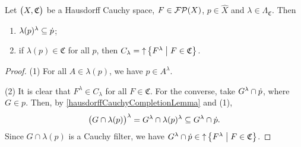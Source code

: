 \begin{lemma} \label{ReedMapToCauchyFilter}
Let $\sSet[\big]{X, \mathfrak{C}}$ be a Hausdorff Cauchy space, $F \in \operatorname{\mathcal{FP}}(X)$, $p\in \hat{X}$ and $\lambda \in \Lambda_\mathfrak{C}$. Then
\begin{enumerate}
\item $\lambda(p)^\lambda \subseteq \dot{p}$;
\item if $\lambda(p)\in \mathfrak{C}$ for all $p$, then $C_\lambda = \upset \setbuilder{F^\lambda}{F\in \mathfrak{C}}$.
\end{enumerate}
\end{lemma}
\begin{proof}
(1) For all $A\in \lambda(p)$, we have $p\in A^\lambda$.

(2) It is clear that $F^\lambda\in C_\lambda$ for all $F\in \mathfrak{C}$. For the converse, take $G^\lambda \cap \dot{p}$, where $G\in p$. Then, by \ref{hausdorffCauchyCompletionLemma} and (1),
\[ \big(G \cap \lambda(p)\big)^\lambda = G^\lambda \cap \lambda(p)^\lambda \subseteq G^\lambda \cap \dot{p}. \]
Since $G \cap \lambda(p)$ is a Cauchy filter, we have $G^\lambda \cap \pfilter{p} \in \upset \setbuilder{F^\lambda}{F\in \mathfrak{C}}$.
\end{proof}

